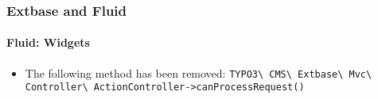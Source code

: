 %

\begin{frame}[fragile]
	\frametitle{Extbase and Fluid}
	\framesubtitle{Fluid: Widgets}


	\begin{itemize}
		\item The following method has been removed:\newline
			\small\texttt{TYPO3\textbackslash
				CMS\textbackslash
				Extbase\textbackslash
				Mvc\textbackslash
				Controller\textbackslash
				ActionController->canProcessRequest()}\normalsize
	\end{itemize}

\end{frame}

